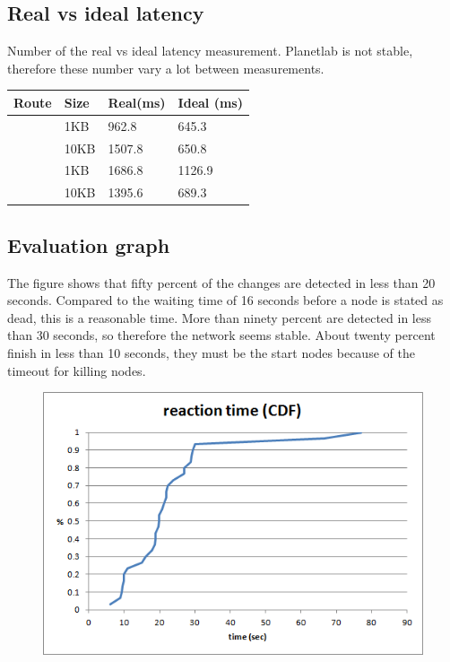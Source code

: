 \documentclass[paper=a4, fontsize=11pt]{scrartcl} %
\numberwithin{equation}{section} %
\numberwithin{figure}{section} %
\numberwithin{table}{section} %
\begin{document}

\subsection{Real vs ideal latency}

Number of the real vs ideal latency measurement. Planetlab is not stable, therefore these number vary a lot between measurements.

\begin{center}
    \begin{tabular}{| l | l | l | l |}
    \hline
    Route & Size & Real(ms) & Ideal (ms) \\ \hline
    [2,9] & 1KB & 962.8 & 645.3 \\ \hline
    [2,9] & 10KB & 1507.8 & 650.8 \\ \hline
    [4,14] & 1KB & 1686.8 & 1126.9 \\ \hline
    [4,14] & 10KB & 1395.6 & 689.3 \\ \hline
    \hline
    \end{tabular}
\end{center}


\subsection{Evaluation graph}

The figure shows that fifty percent of the changes are detected in less than 20 seconds. Compared to the waiting time of 16 seconds before a node is stated as dead, this is a reasonable time. More than ninety percent are detected in less than 30 seconds, so therefore the network seems stable. About twenty percent finish in less than 10 seconds, they must be the start nodes because of the timeout for killing nodes.

\begin{figure}[h!]
\includegraphics[width=\columnwidth]{reaction_cdf.PNG}
\end{figure}
\end{document}
